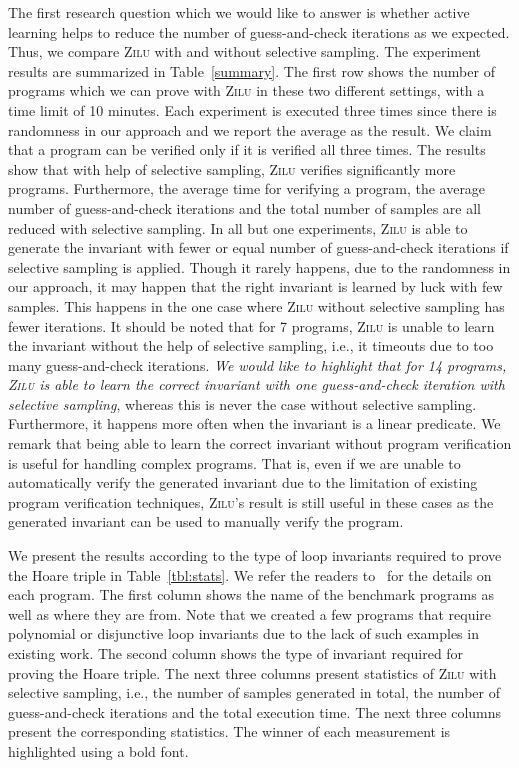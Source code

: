 The first research question which we would like to answer is whether active learning helps to reduce the number of guess-and-check iterations as we expected. Thus, we compare \textsc{Zilu} with and without selective sampling. The experiment results are summarized in Table~\ref{summary}. The first row shows the number of programs which we can prove with \textsc{Zilu} in these two different settings, with a time limit of 10 minutes. Each experiment is executed three times since there is randomness in our approach and we report the average as the result. We claim that a program can be verified only if it is verified all three times. The results show that with help of selective sampling, \textsc{Zilu} verifies significantly more programs. Furthermore, the average time for verifying a program, the average number of guess-and-check iterations and the total number of samples are all reduced with selective sampling. In all but one experiments, \textsc{Zilu} is able to generate the invariant with fewer or equal number of guess-and-check iterations if selective sampling is applied. Though it rarely happens, due to the randomness in our approach, it may happen that the right invariant is learned by luck with few samples. This happens in the one case where \textsc{Zilu} without selective sampling has fewer iterations. It should be noted that for 7 programs, \textsc{Zilu} is unable to learn the invariant without the help of selective sampling, i.e., it timeouts due to too many guess-and-check iterations. \emph{We would like to highlight that for 14 programs, \textsc{Zilu} is able to learn the correct invariant with one guess-and-check iteration with selective sampling}, whereas this is never the case without selective sampling. Furthermore, it happens more often when the invariant is a linear predicate. We remark that being able to learn the correct invariant without program verification is useful for handling complex programs. That is, even if we are unable to automatically verify the generated invariant due to the limitation of existing program verification techniques, \textsc{Zilu}'s result is still useful in these cases as the generated invariant can be used to manually verify the program.

We present the results according to the type of loop invariants required to prove the Hoare triple in Table~\ref{tbl:stats}. We refer the readers to~\cite{zilu:repo} for the details on each program. The first column shows the name of the benchmark programs as well as where they are from. Note that we created a few programs that require polynomial or disjunctive loop invariants due to the lack of such examples in existing work. The second column shows the type of invariant required for proving the Hoare triple. The next three columns present statistics of \textsc{Zilu} with selective sampling, i.e., the number of samples generated in total, the number of guess-and-check iterations and the total execution time. The next three columns present the corresponding statistics. The winner of each measurement is highlighted using a bold font.

